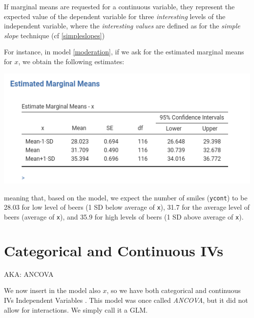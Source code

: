 \documentclass[
]{book}
\begin{document}
If marginal means are requested for a continuous variable, they represent the expected value of the dependent variable for three \emph{interesting} levels of the independent variable, where the \emph{interesting values} are defined as for the \emph{simple slope} technique (cf \ref{simpleslopes})

For instance, in model \ref{moderation}, if we ask for the estimated marginal means for \(x\), we obtain the following estimates:

\includegraphics[width=7.14in]{bookletpics/2_moderation_output1}

meaning that, based on the model, we expect the number of smiles (\texttt{ycont}) to be 28.03 for low level of beers (1 SD below average of \texttt{x}), 31.7 for the average level of beers (average of \texttt{x}), and 35.9 for high levels of beers (1 SD above average of \texttt{x}).

\hypertarget{ancova}{%
\section{Categorical and Continuous IVs}\label{ancova}}

\begin{flushright} AKA: ANCOVA  \end{flushright}

We now insert in the model also \(x\), so we have both categorical and continuous {IVs {Independent Variables} }. This model was once called \emph{ANCOVA}, but it did not allow for interactions. We simply call it a GLM.
\end{document}
